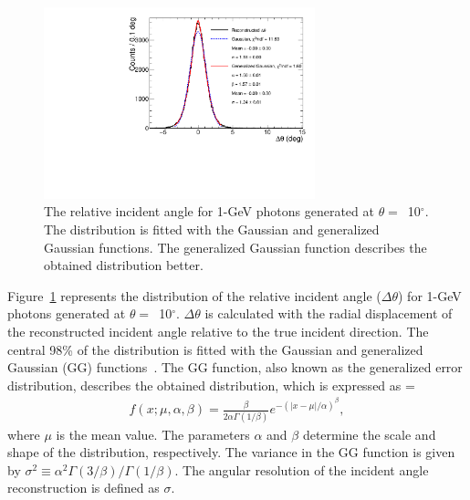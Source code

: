 \documentclass[12pt,times,draftclsnofoot,a4paper]{elsarticle}
\begin{document}
\begin{figure}[!hbt]
\centering
\includegraphics[width=0.7\textwidth]{Fig3_fit_GG.pdf}
\caption{ The relative incident angle for 1-GeV photons generated at $\theta=$~10$^{\circ}$. The distribution is fitted with the Gaussian and generalized Gaussian functions. The generalized Gaussian function describes the obtained distribution better.}
\label{fig:angle_10degree}
\end{figure}

Figure~\ref{fig:angle_10degree} represents the distribution of the relative incident angle ($\Delta\theta$) for 1-GeV photons generated at $\theta=$~10$^{\circ}$. $\Delta\theta$ is calculated with the radial displacement of the reconstructed incident angle relative to the true incident direction. The central 98\% of the distribution is fitted with the Gaussian and generalized Gaussian (GG) functions~\cite{GGfun}. The GG function, also known as the generalized error distribution, describes the obtained distribution, which is expressed as =
\begin{eqnarray} 
f(x; \mu, \alpha, \beta) = \frac{\beta}{2 \alpha \Gamma(1/\beta)}e^{-(|x-\mu|/\alpha)^\beta},
\label{eqn:gg}
\end{eqnarray}
where $\mu$ is the mean value. The parameters $\alpha$ and $\beta$ determine the scale and shape of the distribution, respectively. The variance in the GG function is given by $\sigma^2 \equiv \alpha^2 \Gamma(3/\beta) / \Gamma(1/\beta)$. The angular resolution of the incident angle reconstruction is defined as $\sigma$.
\end{document}
